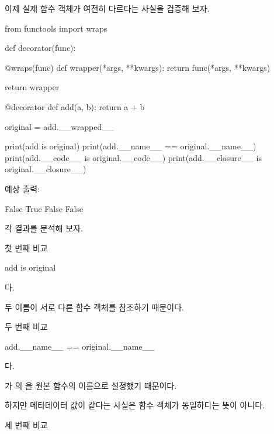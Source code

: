 이제 실제 함수 객체가 여전히 다르다는 사실을 검증해 보자.

\begin{dhkcode}
from functools import wraps


def decorator(func):

    @wraps(func)
    def wrapper(*args, **kwargs):
        return func(*args, **kwargs)

    return wrapper


@decorator
def add(a, b):
    return a + b


original = add.__wrapped__

print(add is original)
print(add.__name__ == original.__name__)
print(add.__code__ is original.__code__)
print(add.__closure__ is original.__closure__)
\end{dhkcode}

예상 출력:

\begin{dhkzsh}
False
True
False
False
\end{dhkzsh}

각 결과를 분석해 보자.

\begin{dhknote}
\begin{dhksmry}[centered]
첫 번째 비교
\end{dhksmry}
\end{dhknote}

\begin{dhkcode}
add is original
\end{dhkcode}

다.

두 이름이 서로 다른 함수 객체를 참조하기 때문이다.

\begin{dhknote}
\begin{dhksmry}[centered]
두 번째 비교
\end{dhksmry}
\end{dhknote}

\begin{dhkcode}
add.__name__ == original.__name__
\end{dhkcode}

다.

가 의 을 원본 함수의 이름으로 설정했기 때문이다.

하지만 메타데이터 값이 같다는 사실은 함수 객체가 동일하다는 뜻이 아니다.

\begin{dhknote}
\begin{dhksmry}[centered]
세 번째 비교
\end{dhksmry}
\end{dhknote}

